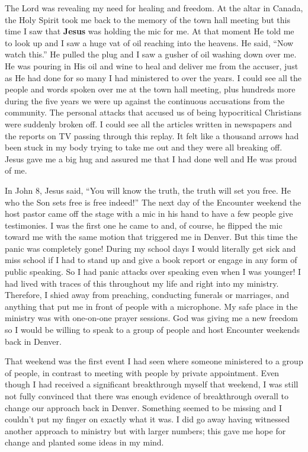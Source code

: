 \documentclass[twoside, 12pt]{book}
\begin{document}
The Lord was revealing my need for healing and freedom. At the altar in Canada, the Holy Spirit took me back to the memory of the town hall meeting but this time I saw that \textbf{Jesus} was holding the mic for me. At that moment He told me to look up and I saw a huge vat of oil reaching into the heavens. He said, “Now watch this.” He pulled the plug and I saw a gusher of oil washing down over me. He was pouring in His oil and wine to heal and deliver me from the accuser, just as He had done for so many I had ministered to over the years. I could see all the people and words spoken over me at the town hall meeting, plus hundreds more during the five years we were up against the continuous accusations from the community. The personal attacks that accused us of being hypocritical Christians were suddenly broken off. I could see all the articles written in newspapers and the reports on TV passing through this replay. It felt like a thousand arrows had been stuck in my body trying to take me out and they were all breaking off. Jesus gave me a big hug and assured me that I had done well and He was proud of me. 

In John 8, Jesus said, “You will know the truth, the truth will set you free. He who the Son sets free is free indeed!” The next day of the Encounter weekend the host pastor came off the stage with a mic in his hand to have a few people give testimonies. I was the first one he came to and, of course, he flipped the mic toward me with the same motion that triggered me in Denver. But this time the panic was completely gone! During my school days I would literally get sick and miss school if I had to stand up and give a book report or engage in any form of public speaking. So I had panic attacks over speaking even when I was younger! I had lived with traces of this throughout my life and right into my ministry. Therefore, I shied away from preaching, conducting funerals or marriages, and anything that put me in front of people with a microphone. My safe place in the ministry was with one-on-one prayer sessions. God was giving me a new freedom so I would be willing to speak to a group of people and host Encounter weekends back in Denver. 

That weekend was the first event I had seen where someone ministered to a group of people, in contrast to meeting with people by private appointment. Even though I had received a significant breakthrough myself that weekend, I was still not fully convinced that there was enough evidence of breakthrough overall to change our approach back in Denver. Something seemed to be missing and I couldn’t put my finger on exactly what it was. I did go away having witnessed another approach to ministry but with larger numbers; this gave me hope for change and planted some ideas in my mind.
\end{document}
